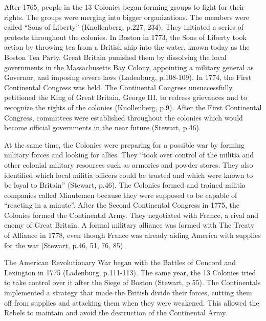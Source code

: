 After 1765, people in the 13 Colonies began forming groups to fight for their
rights.  The groups were merging into bigger organizations.  The members were
called “Sons of Liberty” (Knollenberg, p.227, 234).  They initiated a series of
protests throughout the colonies.  In Boston in 1773, the Sons of Liberty took
action by throwing tea from a British ship into the water, known today as the
Boston Tea Party.  Great Britain punished them by dissolving the local
governments in the Massachusetts Bay Colony, appointing a military general as
Governor, and imposing severe laws (Ladenburg, p.108-109).  In 1774, the First
Continental Congress was held. The Continental Congress unsuccessfully
petitioned the King of Great Britain, George III, to redress grievances and to
recognize the rights of the colonies (Knollenberg, p.9).  After the First
Continental Congress, committees were established throughout the colonies which
would become official governments in the near future (Stewart, p.46).

At the same time, the Colonies were preparing for a possible war by forming
military forces and looking for allies.  They “took over control of the militia
and other colonial military resources such as armories and powder stores.  They
also identified which local militia officers could be trusted and which were
known to be loyal to Britain” (Stewart, p.46).   The Colonies formed and trained
militia companies called Minutemen because they were supposed to be capable of
“reacting in a minute”.  After the Second Continental Congress in 1775, the
Colonies formed the Continental Army.  They negotiated with France, a rival and
enemy of Great Britain.  A formal military alliance was formed with The Treaty
of Alliance in 1778, even though France was already aiding America with supplies
for the war (Stewart, p.46, 51, 76, 85).

The American Revolutionary War began with the Battles of Concord and Lexington
in 1775 (Ladenburg, p.111-113).  The same year, the 13 Colonies tried to take
control over it after the Siege of Boston (Stewart, p.55).  The Continentals
implemented a strategy that made the British divide their forces, cutting them
off from supplies and attacking them when they were weakened.  This allowed the
Rebels to maintain and avoid the destruction of the Continental Army. 

